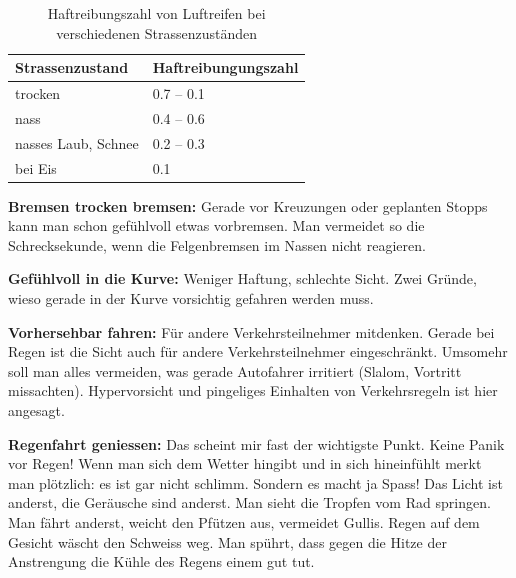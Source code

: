 \begin{table}
  \centering
  \begin{tabular}{ll}
    \toprule
    Strassenzustand & Haftreibungungszahl \\
    \midrule
    trocken         & 0.7 -- 0.1 \\
    nass            & 0.4 -- 0.6 \\
    nasses Laub, Schnee & 0.2 -- 0.3 \\
    bei Eis         & 0.1 \\
    \bottomrule
  \end{tabular}
  \caption{Haftreibungszahl von Luftreifen bei verschiedenen Strassenzuständen \protect\cite{Strommer2016haftreibung}}
  \label{tab:haftreibung}
\end{table}


\textbf{Bremsen trocken bremsen:}
Gerade vor Kreuzungen oder geplanten Stopps kann man schon gefühlvoll etwas vorbremsen.
Man vermeidet so die Schrecksekunde, wenn die Felgenbremsen im Nassen nicht reagieren.

\textbf{Gefühlvoll in die Kurve:}
Weniger Haftung, schlechte Sicht.
Zwei Gründe, wieso gerade in der Kurve vorsichtig gefahren werden muss.

\textbf{Vorhersehbar fahren:}
Für andere Verkehrsteilnehmer mitdenken.
Gerade bei Regen ist die Sicht auch für andere Verkehrsteilnehmer eingeschränkt.
Umsomehr soll man alles vermeiden, was gerade Autofahrer irritiert (Slalom, Vortritt missachten).
Hypervorsicht und pingeliges Einhalten von Verkehrsregeln ist hier angesagt.

\textbf{Regenfahrt geniessen:}
Das scheint mir fast der wichtigste Punkt.
Keine Panik vor Regen!
Wenn man sich dem Wetter hingibt und in sich hineinfühlt merkt man plötzlich: es ist gar nicht schlimm.
Sondern es macht ja Spass!
Das Licht ist anderst, die Geräusche sind anderst. Man sieht die Tropfen vom Rad springen.
Man fährt anderst, weicht den Pfützen aus, vermeidet Gullis.
Regen auf dem Gesicht wäscht den Schweiss weg.
Man spührt, dass gegen die Hitze der Anstrengung die Kühle des Regens einem gut tut.

